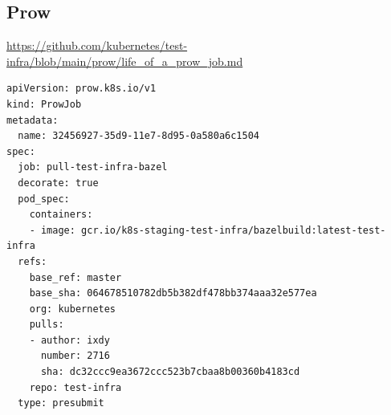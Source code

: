 \subsection{Prow}

\begin{frame}[fragile]
    \autotitle
    \footnotesize
    \url{https://github.com/kubernetes/test-infra/blob/main/prow/life_of_a_prow_job.md}
    \scriptsize
    \begin{verbatim}
apiVersion: prow.k8s.io/v1
kind: ProwJob
metadata:
  name: 32456927-35d9-11e7-8d95-0a580a6c1504
spec:
  job: pull-test-infra-bazel
  decorate: true
  pod_spec:
    containers:
    - image: gcr.io/k8s-staging-test-infra/bazelbuild:latest-test-infra
  refs:
    base_ref: master
    base_sha: 064678510782db5b382df478bb374aaa32e577ea
    org: kubernetes
    pulls:
    - author: ixdy
      number: 2716
      sha: dc32ccc9ea3672ccc523b7cbaa8b00360b4183cd
    repo: test-infra
  type: presubmit
    \end{verbatim}
\end{frame}

